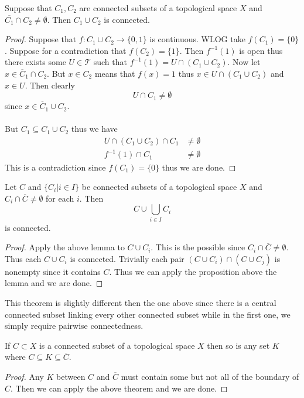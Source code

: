 \begin{lmm}{}{} Suppose that $C_1,C_2$ are connected subsets of a topological space $X$ and $\overline{C_1}\cap C_2\neq\emptyset$. Then $C_1\cup C_2$ is connected. \tcbline
\begin{proof}
Suppose that $f:C_1\cup C_2\to\{0,1\}$ is continuous. WLOG take $f(C_1)=\{0\}$. Suppose for a contradiction that $f(C_2)=\{1\}$. Then $f^{-1}(1)$ is open thus there exists some $U\in\mathcal{T}$ such that $f^{-1}(1)=U\cap(C_1\cup C_2)$. Now let $x\in\overline{C}_1\cap C_2$. But $x\in C_2$ means that $f(x)=1$ thus $x\in U\cap(C_1\cup C_2)$ and $x\in U$. Then clearly $$U\cap C_1\neq\emptyset$$ since $x\in\overline{C}_1\cup C_2$. \\~\\
But $C_1\subseteq C_1\cup C_2$ thus we have 
\begin{align*}
U\cap (C_1\cup C_2)\cap C_1&\neq\emptyset\\
f^{-1}(1)\cap C_1&\neq\emptyset
\end{align*}
This is a contradiction since $f(C_1)=\{0\}$ thus we are done. 
\end{proof}
\end{lmm}

\begin{thm}{}{} Let $C$ and $\{C_i|i\in I\}$ be connected subsets of a topological space $X$ and $C_i\cap\overline{C}\neq\emptyset$ for each $i$. Then $$C\cup\bigcup_{i\in I}C_i$$ is connected. \tcbline
\begin{proof}
Apply the above lemma to $C\cup C_i$. This is the possible since $C_i\cap\overline{C}\neq\emptyset$. Thus each $C\cup C_i$ is connected. Trivially each pair $(C\cup C_i)\cap(C\cup C_j)$ is nonempty since it contains $C$. Thus we can apply the proposition above the lemma and we are done. 
\end{proof}
\end{thm}

This theorem is slightly different then the one above since there is a central connected subset linking every other connected subset while in the first one, we simply require pairwise connectedness. 

\begin{crl}{}{} If $C\subset X$ is a connected subset of a topological space $X$ then so is any set $K$ where $C\subseteq K\subseteq\overline{C}$. \tcbline
\begin{proof}
Any $K$ between $C$ and $\overline{C}$ must contain some but not all of the boundary of $C$. Then we can apply the above theorem and we are done. 
\end{proof}
\end{crl}

